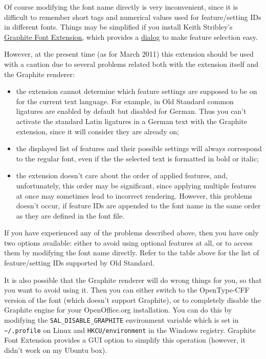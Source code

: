 \documentclass[12pt,a4paper,openany]{book}
\begin{document}
Of course modifying the font name directly is very inconvenient, since
it is difficult to remember short tags and numerical values used for
feature/setting IDs in different fonts. Things may be simplified if you
install Keith Stribley's \href{http://www.thanlwinsoft.org/GraphiteOOoExt/}
{Graphite Font Extension}, which provides a \hyperlink{fig:graphite-ext}{dialog}
to make feature selection easy.

However, at the present time (as for March 2011) this extension should be
used with a caution due to several problems related both with the extension
itself and the Graphite renderer:

\begin{itemize}

\item the extension cannot determine which feature settings are supposed
to be on for the current text language. For example, in Old Standard
common ligatures are enabled by default but disabled for German.
Thus you can't activate the standard Latin ligatures in a German text
with the Graphite extension, since it will consider they are already on;

\item the displayed list of features and their possible settings will
always correspond to the regular font, even if the the selected text is
formatted in bold or italic;

\item the extension doesn't care about the order of applied features,
and, unfortunately, this order may be significant, since applying multiple
features at once may sometimes lead to incorrect rendering. However, this
problems doesn't occur, if feature IDs are appended to the font name in
the same order as they are defined in the font file.

\end{itemize}

If you have experienced any of the problems described above, then you
have only two options available: either to avoid using optional features
at all, or to access them by modifying the font name directly. Refer
to the table above for the list of feature/setting IDs supported by
Old Standard.

It is also possible that the Graphite renderer will do wrong things
for you, so that you want to avoid using it. Then you can either switch
to the OpenType-CFF version of the font (which doesn't support Graphite),
or to completely disable the Graphite engine for your OpenOffice.org
installation. You can do this by modifying the \texttt{SAL\_DISABLE\_GRAPHITE}
environment variable which is set in \texttt{\textasciitilde/.profile} on Linux and
\texttt{HKCU/environment} in the Windows registry. Graphite Font Extension
provides a GUI option to simplify this operation (however, it didn't work on
my Ubuntu box).
\end{document}
